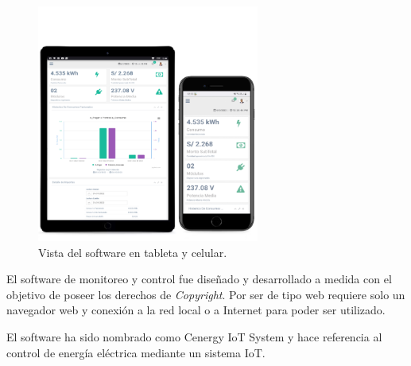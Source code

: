 \vspace{1.0cm}
\begin{figure}[htpb]
\centering 
\includegraphics[width=0.65\textwidth]{./Figures/responsive2.png}
\caption{Vista del software en tableta y celular.}
\label{fig:software2}
\end{figure}

\vspace{1.5cm}

El software de monitoreo y control fue diseñado y desarrollado a medida con el objetivo de poseer los derechos de \emph{Copyright}. Por ser de tipo web requiere solo un navegador web y conexión a la red local o a Internet para poder ser utilizado. 

El software ha sido nombrado como Cenergy IoT System y hace referencia al control de energía eléctrica mediante un sistema IoT.  

